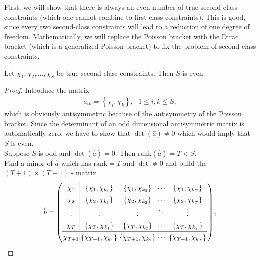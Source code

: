 \pagebreak

First, we will show that there is always an even number of true second-class constraints (which one cannot combine to first-class constraints). This is good, since every two second-class constraints will lead to a reduction of one degree of freedom.
Mathematically, we will replace the Poisson bracket with the Dirac bracket (which is a generalized Poisson bracket) to fix the problem of second-class constraints.

\label{sec:number_secondary_constraints}
\begin{theorem}
Let $\chi_1, \chi_2, \dots, \chi_S$ be true second-class constraints. Then $S$ is even.
\end{theorem}
\begin{proof}
Introduce the  matrix
\begin{align}
\hat{a}_{ik} = \left \{ \chi_i , \chi_k \right \}, \ \ \ 1 \leq i,k \leq S,
\end{align}
which is obviously antisymmetric because of the antisymmetry of the Poisson bracket. Since the determinant of an odd dimensional antisymmetric matrix is automatically zero, we have to show that $\det (\hat{a}) \neq 0$ which would imply that $S$ is even. \\
Suppose $S$ is odd and $\det (\hat{a}) = 0$. Then $\text{rank}(\hat{a}) = T < S$. \\
Find a minor of $\hat{a}$ which has $\text{rank} = T$ and $\det \neq 0$ and build the \\ $(T+1) \times (T+1)$ - matrix
\begin{align}
\hat{b} =
\left( 
\arraycolsep=1.4pt\def\arraystretch{1.4}
\begin{array}{c|cccc}
\chi_1 & \left\{ \chi_1,\chi_{k_1} \right\} & \left\{ \chi_1,\chi_{k_2} \right\} & \cdots & \left\{ \chi_1,\chi_{k_T} \right\} \\
\chi_2 & \left\{ \chi_2,\chi_{k_1} \right\} & \left\{ \chi_2,\chi_{k_2} \right\} & \cdots & \left\{ \chi_2,\chi_{k_T} \right\} \\
\vdots & \vdots & \vdots & \ddots & \vdots \\
\chi_T & \left\{ \chi_T,\chi_{k_1} \right\} & \left\{ \chi_T,\chi_{k_2} \right\} & \cdots & \left\{ \chi_T,\chi_{k_T} \right\} \\ \cline{1-5}
\chi_{T+1} & \left\{ \chi_{T+1},\chi_{k_1} \right\} & \left\{ \chi_{T+1},\chi_{k_2} \right\} & \cdots & \left\{ \chi_{T+1},\chi_{k_T} \right\} 
\end{array} \right),

\end{align}
\end{proof}
